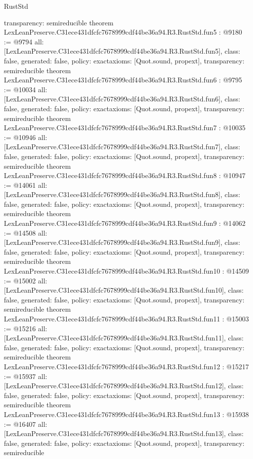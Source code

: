 \begin{lexlean}{RustStd}
\begin{coremodule}
{  transparency: semireducible
}
theorem LexLeanPreserve.C31ece431dfcfc7678999cdf44be36a94.R3.RustStd.fun5 : @9180 := @9794 {
  all: [LexLeanPreserve.C31ece431dfcfc7678999cdf44be36a94.R3.RustStd.fun5],
  class: false,
  generated: false,
  policy: exact{axioms: [Quot.sound, propext]},
  transparency: semireducible
}
theorem LexLeanPreserve.C31ece431dfcfc7678999cdf44be36a94.R3.RustStd.fun6 : @9795 := @10034 {
  all: [LexLeanPreserve.C31ece431dfcfc7678999cdf44be36a94.R3.RustStd.fun6],
  class: false,
  generated: false,
  policy: exact{axioms: [Quot.sound, propext]},
  transparency: semireducible
}
theorem LexLeanPreserve.C31ece431dfcfc7678999cdf44be36a94.R3.RustStd.fun7 : @10035 := @10946 {
  all: [LexLeanPreserve.C31ece431dfcfc7678999cdf44be36a94.R3.RustStd.fun7],
  class: false,
  generated: false,
  policy: exact{axioms: [Quot.sound, propext]},
  transparency: semireducible
}
theorem LexLeanPreserve.C31ece431dfcfc7678999cdf44be36a94.R3.RustStd.fun8 : @10947 := @14061 {
  all: [LexLeanPreserve.C31ece431dfcfc7678999cdf44be36a94.R3.RustStd.fun8],
  class: false,
  generated: false,
  policy: exact{axioms: [Quot.sound, propext]},
  transparency: semireducible
}
theorem LexLeanPreserve.C31ece431dfcfc7678999cdf44be36a94.R3.RustStd.fun9 : @14062 := @14508 {
  all: [LexLeanPreserve.C31ece431dfcfc7678999cdf44be36a94.R3.RustStd.fun9],
  class: false,
  generated: false,
  policy: exact{axioms: [Quot.sound, propext]},
  transparency: semireducible
}
theorem LexLeanPreserve.C31ece431dfcfc7678999cdf44be36a94.R3.RustStd.fun10 : @14509 := @15002 {
  all: [LexLeanPreserve.C31ece431dfcfc7678999cdf44be36a94.R3.RustStd.fun10],
  class: false,
  generated: false,
  policy: exact{axioms: [Quot.sound, propext]},
  transparency: semireducible
}
theorem LexLeanPreserve.C31ece431dfcfc7678999cdf44be36a94.R3.RustStd.fun11 : @15003 := @15216 {
  all: [LexLeanPreserve.C31ece431dfcfc7678999cdf44be36a94.R3.RustStd.fun11],
  class: false,
  generated: false,
  policy: exact{axioms: [Quot.sound, propext]},
  transparency: semireducible
}
theorem LexLeanPreserve.C31ece431dfcfc7678999cdf44be36a94.R3.RustStd.fun12 : @15217 := @15937 {
  all: [LexLeanPreserve.C31ece431dfcfc7678999cdf44be36a94.R3.RustStd.fun12],
  class: false,
  generated: false,
  policy: exact{axioms: [Quot.sound, propext]},
  transparency: semireducible
}
theorem LexLeanPreserve.C31ece431dfcfc7678999cdf44be36a94.R3.RustStd.fun13 : @15938 := @16407 {
  all: [LexLeanPreserve.C31ece431dfcfc7678999cdf44be36a94.R3.RustStd.fun13],
  class: false,
  generated: false,
  policy: exact{axioms: [Quot.sound, propext]},
  transparency: semireducible
}
\end{coremodule}
\end{lexlean}
